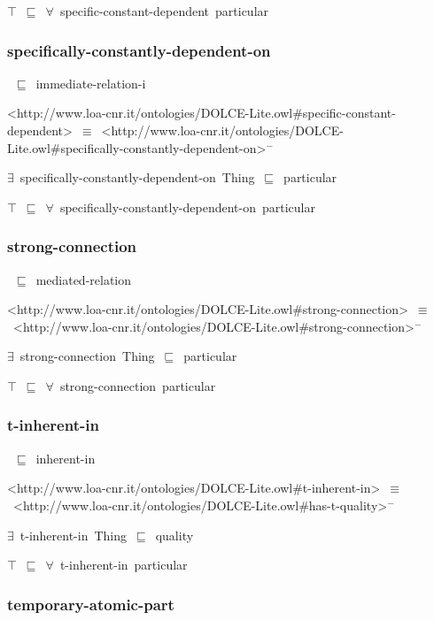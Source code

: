 \documentclass{article}
\begin{document}
\ensuremath{\top}~\ensuremath{\sqsubseteq}~\ensuremath{\forall}~specific-constant-dependent~particular

\subsubsection*{specifically-constantly-dependent-on}

~\ensuremath{\sqsubseteq}~immediate-relation-i

<http://www.loa-cnr.it/ontologies/DOLCE-Lite.owl#specific-constant-dependent>~\ensuremath{\equiv}~<http://www.loa-cnr.it/ontologies/DOLCE-Lite.owl#specifically-constantly-dependent-on>\ensuremath{^-}

\ensuremath{\exists}~specifically-constantly-dependent-on~Thing~\ensuremath{\sqsubseteq}~particular

\ensuremath{\top}~\ensuremath{\sqsubseteq}~\ensuremath{\forall}~specifically-constantly-dependent-on~particular

\subsubsection*{strong-connection}

~\ensuremath{\sqsubseteq}~mediated-relation

<http://www.loa-cnr.it/ontologies/DOLCE-Lite.owl#strong-connection>~\ensuremath{\equiv}~<http://www.loa-cnr.it/ontologies/DOLCE-Lite.owl#strong-connection>\ensuremath{^-}

\ensuremath{\exists}~strong-connection~Thing~\ensuremath{\sqsubseteq}~particular

\ensuremath{\top}~\ensuremath{\sqsubseteq}~\ensuremath{\forall}~strong-connection~particular

\subsubsection*{t-inherent-in}

~\ensuremath{\sqsubseteq}~inherent-in

<http://www.loa-cnr.it/ontologies/DOLCE-Lite.owl#t-inherent-in>~\ensuremath{\equiv}~<http://www.loa-cnr.it/ontologies/DOLCE-Lite.owl#has-t-quality>\ensuremath{^-}

\ensuremath{\exists}~t-inherent-in~Thing~\ensuremath{\sqsubseteq}~quality

\ensuremath{\top}~\ensuremath{\sqsubseteq}~\ensuremath{\forall}~t-inherent-in~particular

\subsubsection*{temporary-atomic-part}
\end{document}
